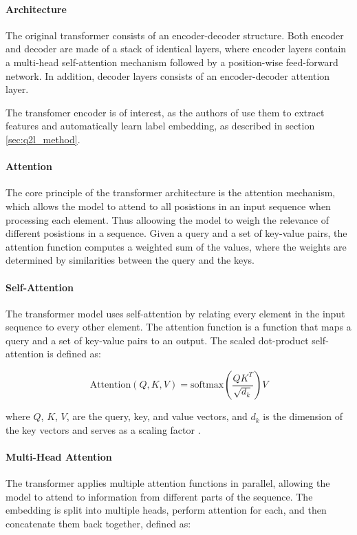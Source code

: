 \documentclass[lettersize,journal]{IEEEtran}
\begin{document}
\paragraph{Architecture}
The original transformer consists of an encoder-decoder structure. Both encoder and decoder are made of a stack of identical layers, where encoder layers contain a multi-head self-attention mechanism followed by a position-wise feed-forward network. In addition, decoder layers consists of an encoder-decoder attention layer. 

The transfomer encoder is of interest, as the authors of \cite{Query2Label} use them to extract features and automatically learn label embedding, as described in section \ref{sec:q2l_method}.

\paragraph{Attention}
The core principle of the transformer architecture is the attention mechanism, which allows the model to attend to all posistions in an input sequence when processing each element. Thus alloowing the model to weigh the relevance of different posistions in a sequence. Given a query and a set of key-value pairs, the attention function computes a weighted sum of the values, where the weights are determined by similarities between the query and the keys.

\paragraph{Self-Attention}
The transformer model uses self-attention by relating every element in the input sequence to every other element. The attention function is a function that maps a query and a set of key-value pairs to an output. The scaled dot-product self-attention is defined as:

\begin{equation}
    \text{Attention}(Q,K,V) = \text{softmax}\left(\frac{QK^T}{\sqrt{d_k}}\right)V
\end{equation}

\noindent where $Q$, $K$, $V$, are the query, key, and value vectors, and $d_k$ is the dimension of the key vectors and serves as a scaling factor \cite{vaswani2023attentionneed}. 

\paragraph{Multi-Head Attention}
The transformer applies multiple attention functions in parallel, allowing the model to attend to information from different parts of the sequence. The embedding is split into multiple heads, perform attention for each, and then concatenate them back together, defined as:
\end{document}

